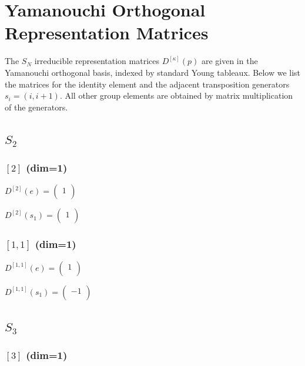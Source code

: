 \documentclass{article}
\begin{document}
\section{Yamanouchi Orthogonal Representation Matrices}

The $S_N$ irreducible representation matrices $D^{[\kappa]}(p)$ are
given in the Yamanouchi orthogonal basis, indexed by standard Young tableaux.
Below we list the matrices for the identity element and the adjacent transposition
generators $s_i = (i,i+1)$. All other group elements are obtained by matrix
multiplication of the generators.

\subsection*{$S_2$}

\subsubsection*{$[2]$ (dim=1)}

$D^{[2]}(e) = \begin{pmatrix}
  1 \\
\end{pmatrix}$

$D^{[2]}(s_1) = \begin{pmatrix}
  1 \\
\end{pmatrix}$

\subsubsection*{$[1,1]$ (dim=1)}

$D^{[1,1]}(e) = \begin{pmatrix}
  1 \\
\end{pmatrix}$

$D^{[1,1]}(s_1) = \begin{pmatrix}
  -1 \\
\end{pmatrix}$


\subsection*{$S_3$}

\subsubsection*{$[3]$ (dim=1)}
\end{document}
